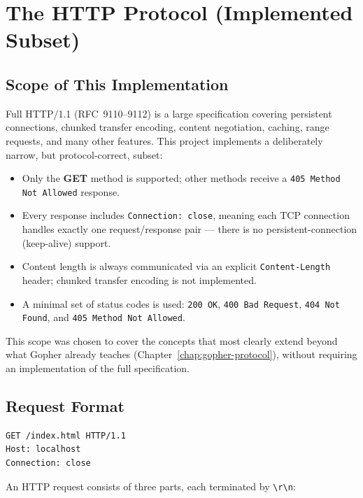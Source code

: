 \chapter{The HTTP Protocol (Implemented Subset)}
\label{chap:http-protocol}

\section{Scope of This Implementation}

Full HTTP/1.1 (RFC~9110--9112) is a large specification covering persistent connections, chunked transfer encoding, content negotiation, caching, range requests, and many other features. This project implements a deliberately narrow, but protocol-correct, subset:

\begin{itemize}
    \item Only the \textbf{GET} method is supported; other methods receive a \texttt{405 Method Not Allowed} response.
    \item Every response includes \texttt{Connection: close}, meaning each TCP connection handles exactly one request/response pair --- there is no persistent-connection (keep-alive) support.
    \item Content length is always communicated via an explicit \texttt{Content-Length} header; chunked transfer encoding is not implemented.
    \item A minimal set of status codes is used: \texttt{200 OK}, \texttt{400 Bad Request}, \texttt{404 Not Found}, and \texttt{405 Method Not Allowed}.
\end{itemize}

This scope was chosen to cover the concepts that most clearly extend beyond what Gopher already teaches (Chapter~\ref{chap:gopher-protocol}), without requiring an implementation of the full specification.

\section{Request Format}

\begin{lstlisting}[style=bashstyle, numbers=none]
GET /index.html HTTP/1.1
Host: localhost
Connection: close

\end{lstlisting}

An HTTP request consists of three parts, each terminated by \texttt{\textbackslash r\textbackslash n}:

